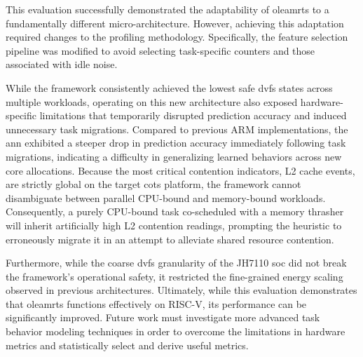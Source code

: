 \documentclass[journal]{IEEEtran}
\begin{document}
This evaluation successfully demonstrated the adaptability of \gls{oleamrts} to a fundamentally different micro-architecture. However, achieving this adaptation required changes to the profiling methodology. Specifically, the feature selection pipeline was modified to avoid selecting task-specific counters and those associated with idle noise.

While the framework consistently achieved the lowest safe \gls{dvfs} states across multiple workloads, operating on this new architecture also exposed hardware-specific limitations that temporarily disrupted prediction accuracy and induced unnecessary task migrations. Compared to previous ARM implementations, the \gls{ann} exhibited a steeper drop in prediction accuracy immediately following task migrations, indicating a difficulty in generalizing learned behaviors across new core allocations. Because the most critical contention indicators, L2 cache events, are strictly global on the target \gls{cots} platform, the framework cannot disambiguate between parallel CPU-bound and memory-bound workloads. Consequently, a purely CPU-bound task co-scheduled with a memory thrasher will inherit artificially high L2 contention readings, prompting the heuristic to erroneously migrate it in an attempt to alleviate shared resource contention.

Furthermore, while the coarse \gls{dvfs} granularity of the JH7110 \gls{soc} did not break the framework's operational safety, it restricted the fine-grained energy scaling observed in previous architectures. Ultimately, while this evaluation demonstrates that \gls{oleamrts} functions effectively on \mbox{RISC-V}, its performance can be significantly improved. Future work must investigate more advanced task behavior modeling techniques in order to overcome the limitations in hardware metrics and statistically select and derive useful metrics.


\small
\end{document}
